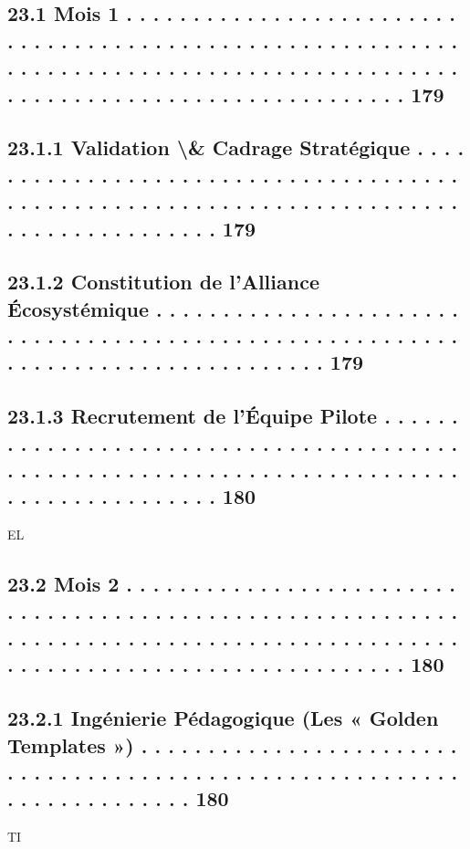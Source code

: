 \subsection{23.1    Mois 1 . . . . . . . . . . . . . . . . . . . . . . . . . . . . . . . . . . . . . . . . . . . . . . . . . . . . . . . . . . . . . . . . . . . . . . . . . . . . . . . . . . . . . . . . . . . . . . . . . . . . . . . . . . . . . . . . . . . . . . . . . . . 179}
\subsection{23.1.1               Validation \textbackslash{}& Cadrage Stratégique . . . . . . . . . . . . . . . . . . . . . . . . . . . . . . . . . . . . . . . . . . . . . . . . . . . . . . . . . . . . . . . . . . . . . . . . . . . . . . . . . . . . . . . . 179}
\subsection{23.1.2               Constitution de l’Alliance Écosystémique . . . . . . . . . . . . . . . . . . . . . . . . . . . . . . . . . . . . . . . . . . . . . . . . . . . . . . . . . . . . . . . . . . . . . . . . . . . . . . . . . 179}
\subsection{23.1.3               Recrutement de l’Équipe Pilote . . . . . . . . . . . . . . . . . . . . . . . . . . . . . . . . . . . . . . . . . . . . . . . . . . . . . . . . . . . . . . . . . . . . . . . . . . . . . . . . . . . . . . . . . . 180}
\vspace{0.5em}
\vspace{0.5em}
\vspace{0.5em}
\vspace{0.5em}
EL\\
\subsection{23.2    Mois 2 . . . . . . . . . . . . . . . . . . . . . . . . . . . . . . . . . . . . . . . . . . . . . . . . . . . . . . . . . . . . . . . . . . . . . . . . . . . . . . . . . . . . . . . . . . . . . . . . . . . . . . . . . . . . . . . . . . . . . . . . . . . 180}
\subsection{23.2.1               Ingénierie Pédagogique (Les « Golden Templates ») . . . . . . . . . . . . . . . . . . . . . . . . . . . . . . . . . . . . . . . . . . . . . . . . . . . . . . . . . . . . . . . . . . . . . . . . 180}
\vspace{0.5em}
\vspace{0.5em}
\vspace{0.5em}
\vspace{0.5em}
TI\\
